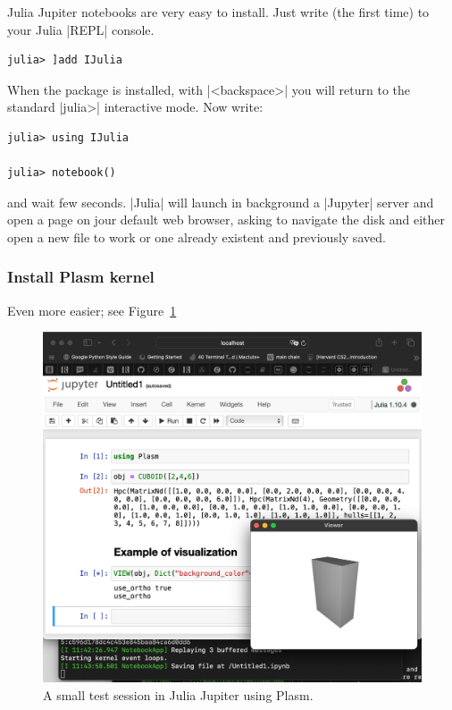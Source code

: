 \begin{coding}
Julia Jupiter notebooks are very easy to install. 
Just write (the first time) to your Julia |REPL| console. 

\begin{lstlisting}[language=JuliaLocal, style=julia, mathescape=true]
julia> ]add IJulia 
\end{lstlisting}

When the package is installed, with |<backspace>| you will return to the standard |julia>| interactive mode.  Now write:

\begin{lstlisting}[language=JuliaLocal, style=julia, mathescape=true]
julia> using IJulia   

julia> notebook()
\end{lstlisting}
and wait few seconds. |Julia| will launch in background a |Jupyter| server and open a page on jour default web browser, asking to navigate the disk and either open a new file to work or one already existent and previously saved.


\subsubsection*{Install Plasm kernel}\label{sect:4-5-1}

Even more easier; see Figure~\ref{fig:jupyter}


\begin{figure}[htbp] %
   \includegraphics[width=\linewidth]{chapter-04/figs/jupyter}%
\caption{A small test session in Julia Jupiter using Plasm.}
\label{fig:jupyter}
\end{figure}


\end{coding}
